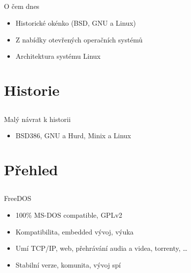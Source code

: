 \documentclass{beamer}
\begin{document}
\subsection{}
\begin{frame}{O čem dnes}
\begin{itemize}
\item Historické okénko (BSD, GNU a Linux)
\item Z nabídky otevřených operačních systémů
\item Architektura systému Linux
\end{itemize}
\end{frame}


\section{Historie}

\subsection{}
\begin{frame}{Malý návrat k historii}
\begin{itemize}
\item BSD386, GNU a Hurd, Minix a Linux
\end{itemize}
\end{frame}


\section{Přehled}

\subsection{}
\begin{frame}{FreeDOS}
\begin{itemize}
\item 100\% MS-DOS compatible, GPLv2
\item Kompatibilita, embedded vývoj, výuka
\item Umí TCP/IP, web, přehrávání audia a videa, torrenty, \dots
\item Stabilní verze, komunita, vývoj spí
\end{itemize}
\end{frame}
\end{document}
